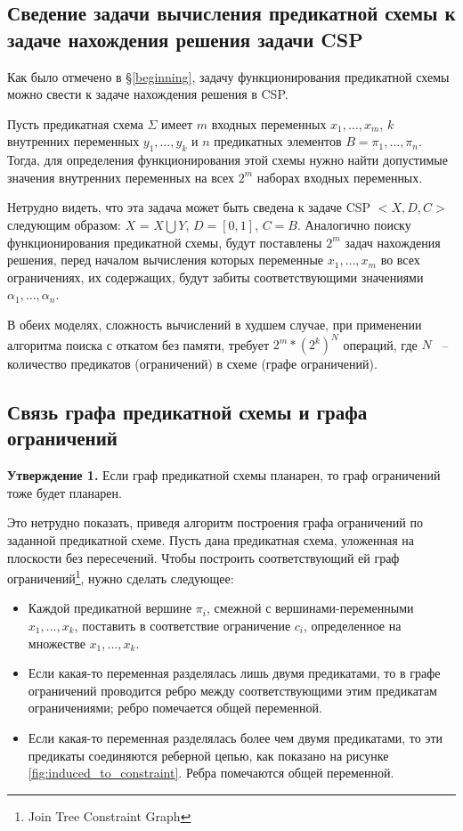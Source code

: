 \documentclass[12pt]{article}
\begin{document}
\subsection{Сведение задачи вычисления предикатной схемы к задаче нахождения решения задачи CSP}
Как было отмечено в \S \ref{beginning}, задачу функционирования предикатной схемы можно свести к задаче нахождения решения в CSP. 

Пусть предикатная схема $\Sigma$ имеет $m$ входных переменных $x_1, \ldots , x_m$, 
$k$ внутренних переменных $y_1, \ldots , y_k$ и $n$ предикатных элементов $B = \pi_1, \dots , \pi_n$. 
Тогда, для определения функционирования этой схемы нужно найти допустимые значения внутренних переменных на всех $2^{m}$
наборах входных переменных. 

Нетрудно видеть, что эта задача может быть сведена к задаче CSP $<X, D, C>$ следующим образом:
$X$ = $X \bigcup Y$, $D = [0, 1]$, $C = B$. Аналогично поиску функционирования предикатной схемы, 
будут поставлены $2^m$ задач нахождения решения, перед началом вычисления которых переменные $x_1, \ldots , x_m$ 
во всех ограничениях, их содержащих, будут забиты соответствующими значениями $\alpha_1, \ldots , \alpha_n$.

В обеих моделях, сложность вычислений в худшем случае, при применении алгоритма поиска 
с откатом без памяти, требует $2^m * (2^k)^N$ операций, где $N$ ~-- количество предикатов (ограничений) 
в схеме (графе ограничений).

\subsection{Связь графа предикатной схемы и графа ограничений}

\textbf{Утверждение 1.} Если граф предикатной схемы планарен, то граф ограничений тоже будет планарен.

Это нетрудно показать, приведя алгоритм построения графа ограничений по заданной предикатной схеме. 
Пусть дана предикатная схема, уложенная на плоскости без пересечений. Чтобы построить соответствующий ей граф
ограничений\footnote{Join Tree Constraint Graph}, нужно сделать следующее:
\begin{itemize}
\item Каждой предикатной вершине $\pi_i$, смежной с вершинами-переменными $x_1, ... , x_k$, поставить в соответствие
ограничение $c_i$, определенное на множестве $x_1, ..., x_k$.
\item Если какая-то переменная разделялась лишь двумя предикатами, то в графе ограничений
проводится ребро между соответствующими этим предикатам ограничениями; ребро помечается общей переменной.
\item Если какая-то переменная разделялась более чем двумя предикатами, то эти предикаты соединяются 
реберной цепью, как показано на рисунке \ref{fig:induced_to_constraint}. Ребра помечаются общей переменной.
\end{itemize}
\end{document}
